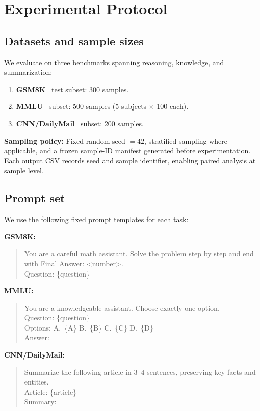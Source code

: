 \section{Experimental Protocol}
\label{sec:protocol}

\subsection{Datasets and sample sizes}

We evaluate on three benchmarks spanning reasoning, knowledge, and summarization:
\begin{enumerate}
    \item \textbf{GSM8K}~\cite{Cobbe2021} test subset: 300 samples.
    \item \textbf{MMLU}~\cite{Hendrycks2020} subset: 500 samples (5 subjects $\times$ 100 each).
    \item \textbf{CNN/DailyMail}~\cite{Narayan2018} subset: 200 samples.
\end{enumerate}

\noindent\textbf{Sampling policy:} Fixed random seed $= 42$, stratified sampling where applicable, and a frozen sample-ID manifest generated before experimentation. Each output CSV records seed and sample identifier, enabling paired analysis at sample level.

\subsection{Prompt set}

We use the following fixed prompt templates for each task:

\smallskip\noindent\textbf{GSM8K:}
\begin{quote}\small
You are a careful math assistant. Solve the problem step by step and end with
Final Answer: \textless number\textgreater.\\
Question: \{question\}
\end{quote}

\noindent\textbf{MMLU:}
\begin{quote}\small
You are a knowledgeable assistant. Choose exactly one option.\\
Question: \{question\}\\
Options: A.~\{A\} B.~\{B\} C.~\{C\} D.~\{D\}\\
Answer:
\end{quote}

\noindent\textbf{CNN/DailyMail:}
\begin{quote}\small
Summarize the following article in 3--4 sentences, preserving key facts and entities.\\
Article: \{article\}\\
Summary:
\end{quote}
